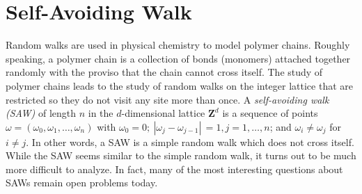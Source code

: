 \documentclass{stml-l}
\theoremstyle{definition}
\numberwithin{equation}{chapter}
\numberwithin{figure}{chapter}
\numberwithin{figure}{section}
\begin{document}
\chapter{Self-Avoiding Walk\label{ch03:chap03}}


Random walks are used in physical chemistry to model polymer chains.
Roughly speaking, a polymer chain is a collection of bonds
(monomers) attached together randomly with the proviso that the
chain cannot cross itself. The study of polymer chains leads to the
study of random walks on the integer lattice that are restricted so
they do not visit any site more than once. A \emph{self-avoiding
walk (SAW)}  of length $n$ in the $d$-dimensional lattice
$\mathbf{Z}^{d}$ is a sequence of points $\omega =
(\omega_{0},\omega_{1},\ldots,\omega_{n})$ with $\omega_{0}=0;\
|\omega_{j}-\omega_{j-1}|\,=1,j=1,\ldots,n$; and
$\omega_{i}\neq\omega_{j}$ for $i\neq j$. In other words, a SAW is a
simple random walk which does not cross itself. While the SAW seems
similar to the simple random walk, it turns out to be much more
difficult to analyze. In fact, many of the most interesting
questions about SAWs remain open problems today.
\end{document}
